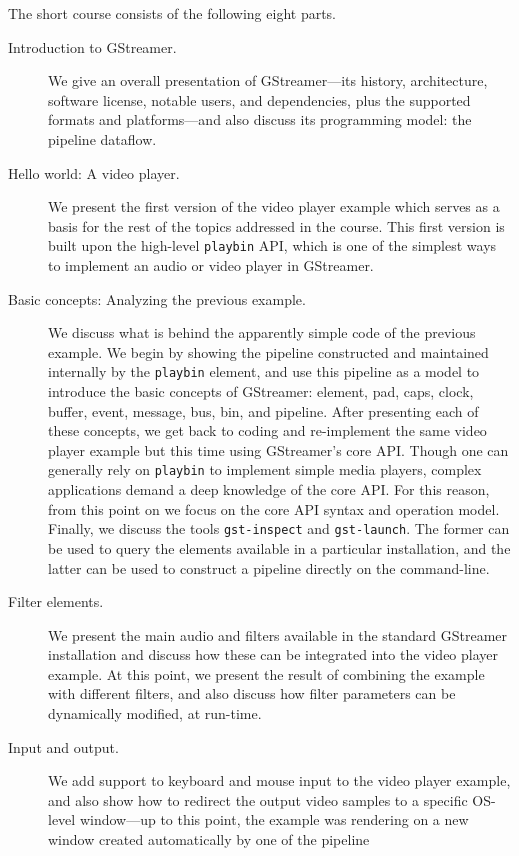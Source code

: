 \documentclass{sig-alternate-05-2015}
\begin{document}
The short course consists of the following eight parts.
\begin{description}
\item[Introduction to GStreamer.]  We give an overall presentation of
  GStreamer---its history, architecture, software license, notable users,
  and dependencies, plus the supported formats and platforms---and also
  discuss its programming model: the pipeline dataflow.
\item[Hello world: A video player.]  We present the first version of the
  video player example which serves as a basis for the rest of the topics
  addressed in the course.  This first version is built upon the high-level
  \texttt{playbin} API, which is one of the simplest ways to implement an
  audio or video player in GStreamer.
\item[Basic concepts: Analyzing the previous example.]  We discuss what is
  behind the apparently simple code of the previous example.  We begin by
  showing the pipeline constructed and maintained internally by the
  \texttt{playbin} element, and use this pipeline as a model to introduce
  the basic concepts of GStreamer: element, pad, caps, clock, buffer, event,
  message, bus, bin, and pipeline.  After presenting each of these concepts,
  we get back to coding and re-implement the same video player example but
  this time using GStreamer's core API.  Though one can generally rely on
  \texttt{playbin} to implement simple media players, complex applications
  demand a deep knowledge of the core API.  For this reason, from this point
  on we focus on the core API syntax and operation model.  Finally, we
  discuss the tools \texttt{gst-inspect} and \texttt{gst-launch}.  The
  former can be used to query the elements available in a particular
  installation, and the latter can be used to construct a pipeline directly
  on the command-line.
\item[Filter elements.]  We present the main audio and filters available in
  the standard GStreamer installation and discuss how these can be
  integrated into the video player example.  At this point, we present the
  result of combining the example with different filters, and also discuss
  how filter parameters can be dynamically modified, at run-time.
\item[Input and output.]  We add support to keyboard and mouse input to the
  video player example, and also show how to redirect the output video
  samples to a specific OS-level window---up to this point, the example was
  rendering on a new window created automatically by one of the pipeline

\end{description}
\end{document}
